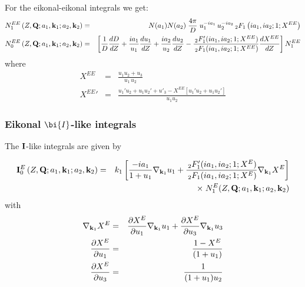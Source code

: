 For the eikonal-eikonal integrals we get:
\begin{eqnarray}\label{Q:NEE}
N^{EE}_{1} \left(Z, \mathbf{Q} ; a_{1}, \mathbf{k}_{1} ; a_{2}, \mathbf{k}_{2}
\right) &=&  N(a_{1}) N(a_{2})\;\frac{4 \pi}{D} \; u_{1}^{-i a_{1}}
\, u_{2}^{-i a_{2}} \, {_{2}F_{1}}\left( i a_{1} , i a_{2} ; 1
; X^{EE} \right)
\\
N^{EE}_{0} \left(Z, \mathbf{Q} ; a_{1}, \mathbf{k}_{1} ; a_{2}, \mathbf{k}_{2}
\right) &=& \left[ \frac{1}{D} \frac{d D}{d Z} + \frac{i
a_{1}}{u_{1}} \frac{d u_{1}}{d Z} + \frac{i a_{2}}{u_{2}}
\frac{d u_{2}}{d Z} - \frac{\,{_{2}F'_{1}}(i a_{1}, i a_{2};
1; X^{EE})}{\,{_{2}F_{1}}(i a_{1}, i a_{2}; 1; X^{EE})} \frac{d
X^{EE}}{d Z} \right] N^{EE}_{1}
\nonumber \\
\end{eqnarray}
%
where
\begin{eqnarray*}
X^{EE} &=& \frac{u_{1} u_{2} + u_{3}}{u_{1} \, u_{2}}  \nonumber \\
{X^{EE}}' &=& \frac{ u_{1}' u_{2} + u_{1} u_{2}' + u'_{3} - X^{EE}
\left[ u_{1}' u_{2} + u_{1} u_{2}' \right]}{u_{1} u_{2}}
\end{eqnarray*}
%
\subsubsection{Eikonal $\bi{I}$-like integrals}

The $\mathbf{I}$-like integrals are given by

\begin{eqnarray}\label{Q:I_Eik}
\mathbf{I}^{E}_{0} \left(Z, \mathbf{Q}; a_{1}, \mathbf{k}_{1} ; a_{2}, \mathbf{k}_{2}
\right) &=& k_{1}  \left[ \frac{- i a_{1}}{1 + u_{1}}
\nabla_{\mathbf{k}_{1}} u_{1}  + \frac{\,{_{2}F'_{1}}(i a_{1}, i a_{2};
1; X^{E})}{\,{_{2}F_{1}}(i a_{1}, i a_{2}; 1; X^{E})}
\nabla_{\mathbf{k}_{1}} X^{E} \right] \nonumber
\\
&& {\times} \; N^{E}_{1}(Z,\mathbf{Q}; a_{1},\mathbf{k}_{1}; a_{2},\mathbf{k}_{2})
\end{eqnarray}
%
with
\begin{eqnarray*}
\nabla_{\mathbf{k}_{1}} X^{E} &=& \frac{\partial X^{E}}{\partial u_{1}}
\nabla_{\mathbf{k}_{1}} u_{1} + \frac{\partial X^{E}}{\partial u_{3}}
\nabla_{\mathbf{k}_{1}} u_{3}
\\
\frac{\partial X^{E}}{\partial u_{1}}  &=& \frac{1-X^{E}}{( 1 + u_{1})}
\nonumber \\
\frac{\partial X^{E}}{\partial u_{3}}  &=& \frac{1}{ ( 1 + u_{1})
u_{2}} \nonumber
\end{eqnarray*}


